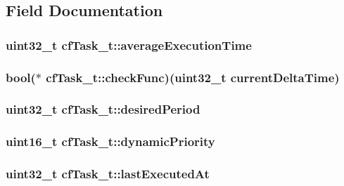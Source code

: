 \subsection{Field Documentation}
\hypertarget{structcfTask__t_ae73851399c3ebae6e22da3e2adc1209c}{
\subsubsection[{average\+Execution\+Time}]{\setlength{\rightskip}{0pt plus 5cm}uint32\+\_\+t cf\+Task\+\_\+t\+::average\+Execution\+Time}}\label{structcfTask__t_ae73851399c3ebae6e22da3e2adc1209c}
\hypertarget{structcfTask__t_a7ded3bd285c19f4dcb59875fdef1c4de}{
\subsubsection[{check\+Func}]{\setlength{\rightskip}{0pt plus 5cm}bool($\ast$ cf\+Task\+\_\+t\+::check\+Func)(uint32\+\_\+t current\+Delta\+Time)}}\label{structcfTask__t_a7ded3bd285c19f4dcb59875fdef1c4de}
\hypertarget{structcfTask__t_a2a8ae0186ff4de6c3915fff83ce88e36}{
\subsubsection[{desired\+Period}]{\setlength{\rightskip}{0pt plus 5cm}uint32\+\_\+t cf\+Task\+\_\+t\+::desired\+Period}}\label{structcfTask__t_a2a8ae0186ff4de6c3915fff83ce88e36}
\hypertarget{structcfTask__t_a56051dcbe2e46a7551bfee039d1f36b6}{
\subsubsection[{dynamic\+Priority}]{\setlength{\rightskip}{0pt plus 5cm}uint16\+\_\+t cf\+Task\+\_\+t\+::dynamic\+Priority}}\label{structcfTask__t_a56051dcbe2e46a7551bfee039d1f36b6}
\hypertarget{structcfTask__t_a434abf9bffed7f40d3d76ed7445d3cda}{
\subsubsection[{last\+Executed\+At}]{\setlength{\rightskip}{0pt plus 5cm}uint32\+\_\+t cf\+Task\+\_\+t\+::last\+Executed\+At}}\label{structcfTask__t_a434abf9bffed7f40d3d76ed7445d3cda}
